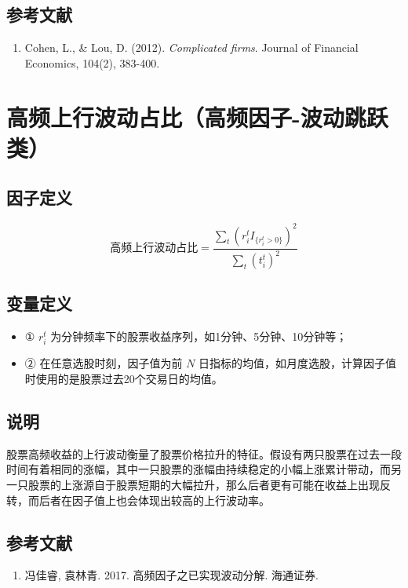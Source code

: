 \documentclass{article}
\begin{document}
\subsection{参考文献}
\begin{enumerate}
    \item Cohen, L., \& Lou, D. (2012). \textit{Complicated firms}. Journal of Financial Economics, 104(2), 383-400.
\end{enumerate}

\section{高频上行波动占比（高频因子-波动跳跃类）}

\subsection{因子定义}
\begin{equation}
    \text{高频上行波动占比} = \frac{\sum_t(r_i^tI_{\{r_i^t>0\}})^2}{\sum_t(t_i^t)^2}
\end{equation}

\subsection{变量定义}
\begin{itemize}
    \item ① \( r_{i}^t \) 为分钟频率下的股票收益序列，如1分钟、5分钟、10分钟等；
    \item ② 在任意选股时刻，因子值为前 \( N \) 日指标的均值，如月度选股，计算因子值时使用的是股票过去20个交易日的均值。
\end{itemize}

\subsection{说明}
股票高频收益的上行波动衡量了股票价格拉升的特征。假设有两只股票在过去一段时间有着相同的涨幅，其中一只股票的涨幅由持续稳定的小幅上涨累计带动，而另一只股票的上涨源自于股票短期的大幅拉升，那么后者更有可能在收益上出现反转，而后者在因子值上也会体现出较高的上行波动率。

\subsection{参考文献}
\begin{enumerate}
    \item 冯佳睿, 袁林青. 2017. 高频因子之已实现波动分解. 海通证券.
\end{enumerate}
\end{document}

